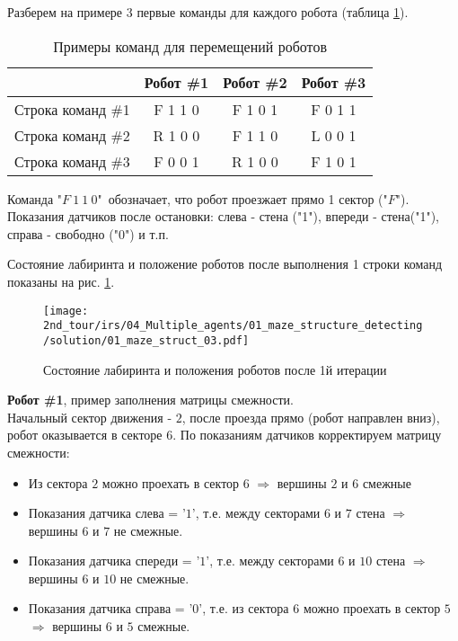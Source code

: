 Разберем на примере 3 первые команды для каждого робота (таблица \ref{table:01_maze_struct_01}).
\\

\begin{table}[h!]
	\begin{center}
		\begin{tabular}{|c|c|c|c|}
			\hline 
			& Робот \#1 & Робот \#2 & Робот \#3 \\ 
			\hline 
			Строка команд \#1 & F 1 1 0 & F 1 0 1 & F 0 1 1 \\ 
			\hline 
			Строка команд \#2 & R 1 0 0 & F 1 1 0 & L 0 0 1 \\ 
			\hline 
			Строка команд \#3 & F 0 0 1 & R 1 0 0 & F 1 0 1 \\ 
			\hline 
		\end{tabular} 
		\caption{Примеры команд для перемещений роботов}
		\label{table:01_maze_struct_01}
	\end{center}
\end{table}


Команда "$F\ 1\ 1\ 0$"\ обозначает, что робот проезжает прямо 1 сектор ("$F$"). Показания датчиков после остановки: слева - стена ("1"), впереди - стена("1"), справа - свободно ("0") и т.п. 

Состояние лабиринта и положение роботов после выполнения 1 строки команд показаны на рис. \ref{fig:01_maze_struct_03}.
\begin{figure}[h!]
	\centering
	\texttt{[image: 2nd\_tour/irs/04\_Multiple\_agents/01\_maze\_structure\_detecting/solution/01\_maze\_struct\_03.pdf]}
	\caption{Состояние лабиринта и положения роботов после 1й итерации}
	\label{fig:01_maze_struct_03}
\end{figure}

\textbf{Робот \#1}, пример заполнения матрицы смежности.\\ Начальный сектор движения - $2$, после проезда прямо (робот направлен вниз), робот оказывается в секторе $6$. По показаниям датчиков корректируем матрицу смежности: 
\begin{itemize}
	\item Из сектора $2$ можно проехать в сектор $6$ $\Rightarrow$ вершины $2$ и $6$ смежные
	\item Показания датчика слева = '$1$', т.е. между секторами $6$ и $7$ стена $\Rightarrow$ вершины $6$ и $7$ не смежные.
	\item Показания датчика спереди = '$1$', т.е. между секторами $6$ и $10$ стена $\Rightarrow$ вершины $6$ и $10$ не смежные.
	\item Показания датчика справа = '$0$', т.е. из сектора $6$ можно проехать в сектор $5$ $\Rightarrow$ вершины $6$ и $5$ смежные.
\end{itemize}

